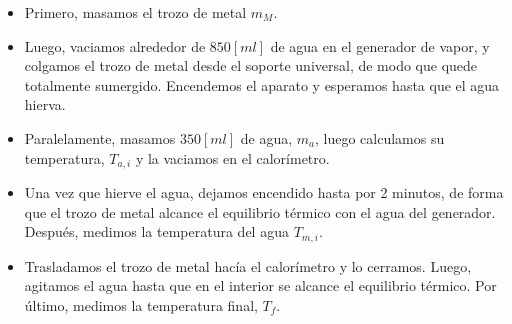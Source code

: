 \documentclass[a4paper, 12p]{article}
\begin{document}
\begin{itemize}
      \item Primero, masamos el trozo de metal $m_M$.
      \item Luego, vaciamos alrededor de $850 [ml]$ de agua en el generador de vapor, y colgamos el trozo de metal desde el soporte universal,
      de modo que quede totalmente sumergido. Encendemos el aparato y esperamos hasta que el agua hierva.
      \item Paralelamente, masamos $350 [ml]$ de agua, $m_a$, luego calculamos su temperatura, $T_{a,i}$ y la vaciamos en el calorímetro. 
      \item Una vez que hierve el agua, dejamos encendido hasta por 2 minutos, de forma que el trozo de metal alcance el 
      equilibrio térmico con el agua del generador. Después, medimos la temperatura del agua $T_{m,i}$.
      \item Trasladamos el trozo de metal hacía el calorímetro y lo cerramos. Luego, agitamos el agua hasta que en el interior se 
      alcance el equilibrio térmico. Por último, medimos la temperatura final, $T_f$.
\end{itemize}
\end{document}
